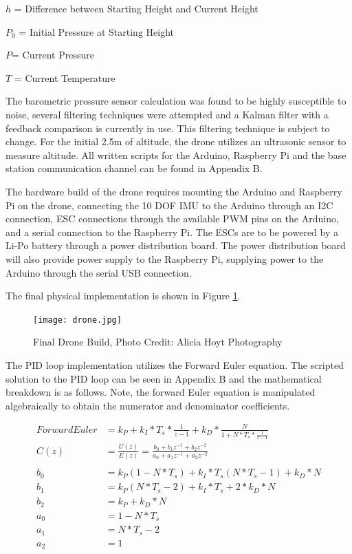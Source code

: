 $h$ = Difference between Starting Height and Current Height

$P_{0}$ = Initial Pressure at Starting Height

$P$= Current Pressure

$T$ = Current Temperature

\vspace*{0.2in}

The barometric pressure sensor calculation was found to be highly susceptible to noise, several filtering techniques were attempted and a Kalman filter with a feedback comparison is currently in use. This filtering technique is subject to change. For the initial 2.5m of altitude, the drone utilizes an ultrasonic sensor to measure altitude. All written scripts for the Arduino, Raspberry Pi and the base station communication channel can be found in Appendix B. 

The hardware build of the drone requires mounting the Arduino and Raspberry Pi on the drone, connecting the 10 DOF IMU to the Arduino through an I2C connection, ESC connections through the available PWM pins on the Arduino, and a serial connection to the Raspberry Pi. The ESCs are to be powered by a Li-Po battery through a power distribution board. The power distribution board will also provide power supply to the Raspberry Pi, supplying power to the Arduino through the serial USB connection.

The final physical implementation is shown in Figure \ref{fig:drone_build}.

\begin{figure}[H]
	\centering
	\texttt{[image: drone.jpg]}
	\caption{Final Drone Build, Photo Credit: Alicia Hoyt Photography}
	\label{fig:drone_build}	
\end{figure}



The PID loop implementation utilizes the Forward Euler equation. The scripted solution to the PID loop can be seen in Appendix B and the mathematical breakdown is as follows. Note, the forward Euler equation is manipulated algebraically to obtain the numerator and denominator coefficients. 

\begin{align*}
          Forward Euler &= k_P+k_I * T_s * \frac{1}{z-1} + k_D * \frac{N}{1+N*T_s*\frac{1}{z-1}} \\
           C(z) & = \frac{U(z)}{E(z)} = \frac{b_0 +b_1z^{-1}+b_2z^{-2}}{a_0 +a_1z^{-1}+a_2z^{-2}}\\
           \\
          b_0 & = k_P(1-N*T_s) + k_I*T_s(N*T_s-1)+k_D*N \\
          b_1 & = k_P(N*T_s-2) + k_I*T_s+2*k_D*N \\
          b_2 & = k_P+k_D*N \\
          a_0 & = 1-N*T_s \\
          a_1 & = N*T_s-2 \\
          a_2 & = 1 \\
\end{align*}

